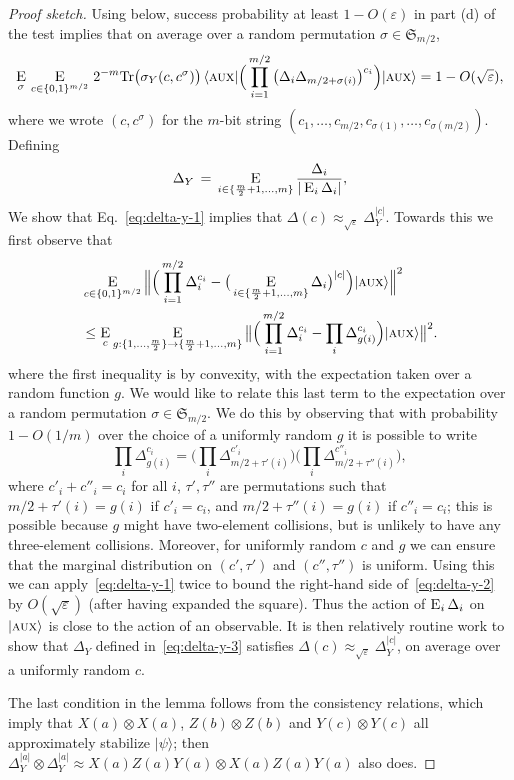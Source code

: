 \documentclass{toc}
\newcommand{\ket}[1]{|#1\rangle}
\newcommand{\bra}[1]{\langle#1|}
\newcommand{\Tr}{\mbox{\rm Tr}}
\newcommand{\Es}[1]{\ensuremath{\mathop{\textsc{E}}}_{#1}} %
\newcommand{\eps}{\varepsilon}
\newcommand{\aux}{\textsc {aux}}
\begin{document}
\begin{proof}[Proof sketch]
Using  below, success probability at least $1-O(\eps)$ in part (d) of the test implies that on average over a random permutation $\sigma \in \mathfrak{S}_{m/2}$, 
\begin{equation}\label{eq:delta-y-1}
 \Es{\sigma} \,\Es{c\in\{0,1\}^{m/2}}\,2^{-m}\Tr \big(\sigma_Y(c,c^\sigma)\big)\,\bra{\aux} \Big( \prod_{i=1}^{m/2}\big( \Delta_i \Delta_{m/2+ \sigma(i)} \big)^{c_i} \Big) \ket{\aux}  = 1- O(\sqrt{\eps}),
\end{equation}
where we wrote $(c,c^\sigma)$ for the $m$-bit string $(c_1,\ldots,c_{m/2},c_{\sigma(1)},\ldots,c_{\sigma(m/2)})$. Defining
 \begin{equation}\label{eq:delta-y-3}
\Delta_Y \,=\, \Es{i\in\{\frac{m}{2}+1,\ldots,m\}} \frac{\Delta_i}{|\Es{i} \Delta_i|},
\end{equation}
We show that Eq.~\eqref{eq:delta-y-1} implies that $\Delta(c) \approx_{\sqrt{\eps}} \Delta_Y^{|c|}$. Towards this we first observe that
\begin{align}
  &\Es{c\in\{0,1\}^{m/2}} \Big\| \Big(\prod_{i=1}^{m/2} \Delta_i^{c_i} -
  \big(\Es{i\in\{\frac{m}{2}+1,\ldots,m\}} \Delta_{i}\big)^{|c|}\Big) \ket{\aux}
  \Big\|^2\\&\leq 
\Es{c} \Es{g:\{1,\ldots,\frac{m}{2}\}\to\{\frac{m}{2}+1,\ldots,m\}} \big\|\Big(\prod_{i=1}^{m/2} \Delta_i^{c_i} - \prod_i \Delta_{g(i)}^{c_i}\Big) \ket{\aux} \big\|^2.\label{eq:delta-y-2}
\end{align}
where the first inequality is by convexity, with the expectation taken over a random function $g$. We would like to relate this last term to the expectation over a random permutation $\sigma\in\mathfrak{S}_{m/2}$. We do this by observing that with  probability $1-O(1/m)$ over the choice of a uniformly random $g$ it is possible to write
$$ \prod_i \Delta_{g(i)}^{c_i} = \Big(\prod_i \Delta_{m/2+\tau'(i)}^{c'_i}\Big)\Big(\prod_i \Delta_{m/2+\tau''(i)}^{c''_i}\Big),$$
where $c'_i+c''_i=c_i$ for all $i$, $\tau',\tau''$ are permutations such that $m/2+\tau'(i)=g(i)$ if $c'_i=c_i$, and $m/2+\tau''(i)=g(i)$ if $c''_i=c_i$; this is possible because $g$ might have two-element collisions, but is unlikely to have any three-element collisions. Moreover, for uniformly random $c$ and $g$ we can ensure that the marginal distribution on $(c',\tau')$ and $(c'',\tau'')$ is uniform.  Using this we can apply~\eqref{eq:delta-y-1} twice to bound the right-hand side of~\eqref{eq:delta-y-2} by $O(\sqrt{\eps})$ (after having expanded the square). Thus the action of $\Es{i}\Delta_i$ on $\ket{\aux}$ is close to the action of an observable. It is then relatively routine work to show that $\Delta_Y$ defined in~\eqref{eq:delta-y-3} satisfies $\Delta(c) \approx_{\sqrt{\eps}} \Delta_Y^{|c|}$, on average over a uniformly random $c$. 

The last condition in the lemma follows from the consistency relations, which imply that $X(a)\otimes X(a)$, $Z(b)\otimes Z(b)$ and $Y(c)\otimes Y(c)$ all approximately stabilize $\ket{\psi}$; then $\Delta_Y^{|a|} \otimes \Delta_Y^{|a|} \approx  X(a)Z(a)Y(a) \otimes X(a)Z(a)Y(a)$ also does. 
\end{proof}
\end{document}
